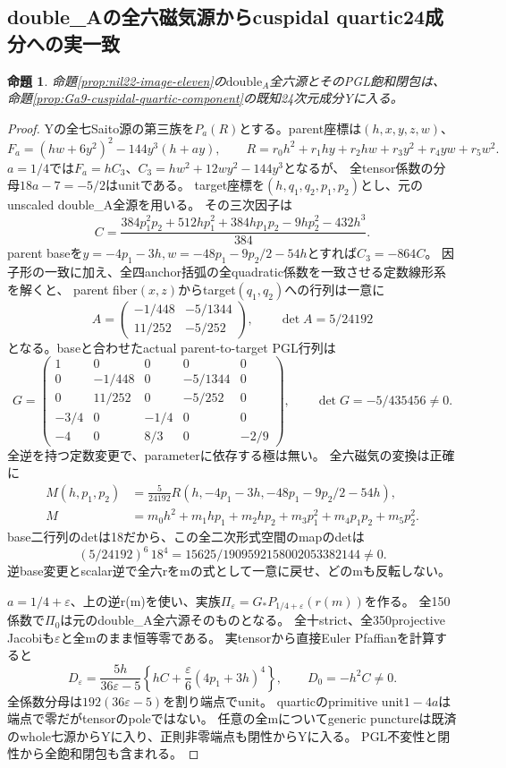 \documentclass[a4paper,11pt]{ltjsarticle}
\newtheorem{proposition}{命題}[section]
\theoremstyle{definition}
\begin{document}
\subsection{double\_Aの全六磁気源からcuspidal quartic24成分への実一致}
\begin{proposition}\label{prop:nil22-doubleA-cuspidal}
命題\ref{prop:nil22-image-eleven}の$\mathrm{double}_A$全六源とそのPGL飽和閉包は、
命題\ref{prop:Ga9-cuspidal-quartic-component}の既知24次元成分Yに入る。
\end{proposition}
\begin{proof}
Yの全七Saito源の第三族を$P_a(R)$とする。parent座標は$(h,x,y,z,w)$、
\[
 F_a=(hw+6y^2)^2-144y^3(h+ay),\qquad
 R=r_0h^2+r_1hy+r_2hw+r_3y^2+r_4yw+r_5w^2.
\]
$a=1/4$では$F_a=hC_3$、$C_3=hw^2+12wy^2-144y^3$となるが、
全tensor係数の分母$18a-7=-5/2$はunitである。
target座標を$(h,q_1,q_2,p_1,p_2)$とし、元のunscaled double\_A全源を用いる。
その三次因子は
\[
 C=\frac{384p_1^2p_2+512hp_1^2+384hp_1p_2-9hp_2^2-432h^3}{384}.
\]
parent baseを$y=-4p_1-3h,w=-48p_1-9p_2/2-54h$とすれば$C_3=-864C$。
因子形の一致に加え、全四anchor括弧の全quadratic係数を一致させる定数線形系を解くと、
parent fiber$(x,z)$からtarget$(q_1,q_2)$への行列は一意に
\[
 A=\begin{pmatrix}-1/448&-5/1344\\11/252&-5/252\end{pmatrix},
 \qquad\det A=5/24192
\]
となる。baseと合わせたactual parent-to-target PGL行列は
\[
 G=\begin{pmatrix}
 1&0&0&0&0\\
 0&-1/448&0&-5/1344&0\\
 0&11/252&0&-5/252&0\\
 -3/4&0&-1/4&0&0\\
 -4&0&8/3&0&-2/9
 \end{pmatrix},\qquad\det G=-5/435456\ne0.
\]
全逆を持つ定数変更で、parameterに依存する極は無い。
全六磁気の変換は正確に
\[
\begin{aligned}
 M(h,p_1,p_2)&=\frac5{24192}R(h,-4p_1-3h,-48p_1-9p_2/2-54h),\\
 M&=m_0h^2+m_1hp_1+m_2hp_2+m_3p_1^2+m_4p_1p_2+m_5p_2^2.
\end{aligned}
\]
base二行列のdetは18だから、この全二次形式空間のmapのdetは
\[
 (5/24192)^6\,18^4=15625/1909592158002053382144\ne0.
\]
逆base変更とscalar逆で全六rをmの式として一意に戻せ、どのmも反転しない。

$a=1/4+\varepsilon$、上の逆r(m)を使い、実族$\Pi_\varepsilon=G_*P_{1/4+\varepsilon}(r(m))$を作る。
全150係数で$\Pi_0$は元のdouble\_A全六源そのものとなる。
全十strict、全350projective Jacobiも$\varepsilon$と全mのまま恒等零である。
実tensorから直接Euler Pfaffianを計算すると
\[
 D_\varepsilon=\frac{5h}{36\varepsilon-5}
       \left\{hC+\frac\varepsilon6(4p_1+3h)^4\right\},\qquad D_0=-h^2C\ne0.
\]
全係数分母は$192(36\varepsilon-5)$を割り端点でunit。
quarticのprimitive unit$1-4a$は端点で零だがtensorのpoleではない。
任意の全mについてgeneric punctureは既済のwhole七源からYに入り、正則非零端点も閉性からYに入る。
PGL不変性と閉性から全飽和閉包も含まれる。
\end{proof}
\end{document}
